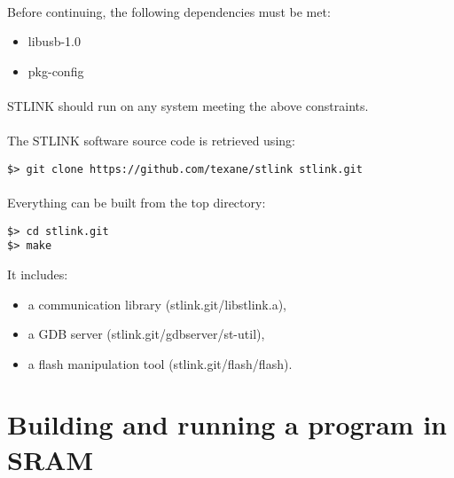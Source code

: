 \documentclass[a4paper, 11pt]{article}
\begin{document}
\paragraph{}
Before continuing, the following dependencies must be met:
\begin{itemize}
\item libusb-1.0
\item pkg-config
\end{itemize}

\paragraph{}
STLINK should run on any system meeting the above constraints.

\paragraph{}
The STLINK software source code is retrieved using:\\
\begin{small}
\begin{lstlisting}[frame=tb]
$> git clone https://github.com/texane/stlink stlink.git
\end{lstlisting}
\end{small}

\paragraph{}
Everything can be built from the top directory:\\
\begin{small}
\begin{lstlisting}[frame=tb]
$> cd stlink.git
$> make 
\end{lstlisting}
\end{small}
It includes:
\begin{itemize}
\item a communication library (stlink.git/libstlink.a),
\item a GDB server (stlink.git/gdbserver/st-util),
\item a flash manipulation tool (stlink.git/flash/flash).
\end{itemize}


\newpage
\section{Building and running a program in SRAM}
\end{document}
